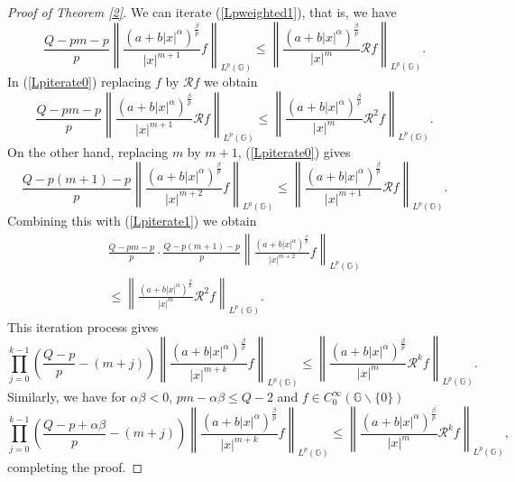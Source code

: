 \documentclass[a4paper,12pt,reqno]{amsart}
\renewcommand\eqref[1]{(\ref{#1})} %
\numberwithin{equation}{section}
\theoremstyle{plain}
\theoremstyle{definition}
\begin{document}
\begin{proof}[Proof of Theorem \ref{2}] We can iterate \eqref{Lpweighted1}, that is, we have
\begin{equation}\label{Lpiterate0}
\frac{Q-pm-p}{p}
\left\|\frac{(a+b|x|^{\alpha})^{\frac{\beta}{p}}}{|x|^{m+1}}f\right\|_{L^{p}(\mathbb{G})}
\leq\left\|\frac{(a+b|x|^{\alpha})^{\frac{\beta}{p}}}{|x|^{m}}\mathcal{R}f\right\|_{L^{p}(\mathbb{G})}.
\end{equation}
In \eqref{Lpiterate0} replacing $f$ by $\mathcal{R}f$ we obtain
\begin{equation}\label{Lpiterate1}
\frac{Q-pm-p}{p}
\left\|\frac{(a+b|x|^{\alpha})^{\frac{\beta}{p}}}{|x|^{m+1}}\mathcal{R}f\right\|_{L^{p}(\mathbb{G})}
\leq\left\|\frac{(a+b|x|^{\alpha})^{\frac{\beta}{p}}}{|x|^{m}}\mathcal{R}^{2}f\right\|_{L^{p}(\mathbb{G})}.
\end{equation}
On the other hand, replacing $m$ by $m+1$, \eqref{Lpiterate0} gives
\begin{equation}\label{Lpiterate2}
\frac{Q-p(m+1)-p}{p}
\left\|\frac{(a+b|x|^{\alpha})^{\frac{\beta}{p}}}{|x|^{m+2}}f\right\|_{L^{p}(\mathbb{G})}
\leq\left\|\frac{(a+b|x|^{\alpha})^{\frac{\beta}{p}}}{|x|^{m+1}}\mathcal{R}f\right\|_{L^{p}(\mathbb{G})}
.
\end{equation}
Combining this with \eqref{Lpiterate1} we obtain
\begin{multline*}\label{Lpiterate3}
\frac{Q-pm-p}{p}\cdot\frac{Q-p(m+1)-p}{p}
\left\|\frac{(a+b|x|^{\alpha})^{\frac{\beta}{p}}}{|x|^{m+2}}f\right\|_{L^{p}(\mathbb{G})} \\
\leq\left\|\frac{(a+b|x|^{\alpha})^{\frac{\beta}{p}}}{|x|^{m}}\mathcal{R}^{2}f\right\|_{L^{p}(\mathbb{G})}.
\end{multline*}
This iteration process gives
\begin{equation*}\label{Lpweighted5}
\prod_{j=0}^{k-1}\left(\frac{Q-p}{p}-(m+j)\right)
\left\|\frac{(a+b|x|^{\alpha})^{\frac{\beta}{p}}}{|x|^{m+k}}f\right\|_{L^{p}(\mathbb{G})}
\leq\left\|\frac{(a+b|x|^{\alpha})^{\frac{\beta}{p}}}{|x|^{m}}\mathcal{R}^{k}f\right\|_{L^{p}(\mathbb{G})}
.
\end{equation*}
Similarly, we have for $\alpha \beta<0$, $pm-\alpha\beta\leq Q-2$ and $f\in C_{0}^{\infty}(\mathbb{G}\backslash\{0\})$
\begin{equation*}\label{Lpweighted6}
\prod_{j=0}^{k-1}\left(\frac{Q-p+\alpha\beta}{p}-(m+j)\right)
\left\|\frac{(a+b|x|^{\alpha})^{\frac{\beta}{p}}}{|x|^{m+k}}f\right\|_{L^{p}(\mathbb{G})}
\leq\left\|\frac{(a+b|x|^{\alpha})^{\frac{\beta}{p}}}{|x|^{m}}\mathcal{R}^{k}f\right\|_{L^{p}(\mathbb{G})}
,
\end{equation*}
completing the proof.
\end{proof}
\end{document}
